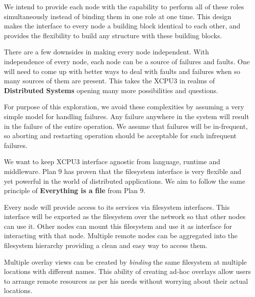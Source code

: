 We intend to provide each node with the capability to perform all of these roles
simultaneously instead of binding them in one role at one time.  This design
makes the interface to every node a building block identical to each other, 
and provides the flexibility to build any structure with these building blocks.

There are a few downsides in making every node independent.  With independence
of every node, each node can be a source of failures and faults.
One will need to come up with better ways to deal with faults and
failures when so many sources of them are present.  This takes the XCPU3 in
realms of \textbf{Distributed Systems} opening many more possibilities and
questions.

For purpose of this exploration, we avoid these complexities by assuming a very
simple model for handling failures.  Any failure anywhere in the system will
result in the failure of the entire operation.  We assume that failures will
be in-frequent, so aborting and restarting operation should be acceptable for
such infrequent failures.

We want to keep XCPU3 interface agnostic from language, runtime and middleware.
Plan 9 has proven that the filesystem interface is very flexible and yet
powerful in the world of distributed applications.  We aim to follow the same
principle of \textbf{Everything is a file} from Plan 9.

Every node will provide access to its services via filesystem interfaces.
This interface will be exported as the filesystem over the network so that other
nodes can use it. Other nodes can mount this filesystem and use it as
interface for interacting with that node.  Multiple remote nodes can be
aggregated into the filesystem hierarchy providing a clean and easy way to
access them.

Multiple overlay views can be created by \textit{binding} the same filesystem
at multiple locations with different names.  This ability of creating ad-hoc
overlays allow users to arrange remote resources as per his needs without
worrying about their actual locations.

